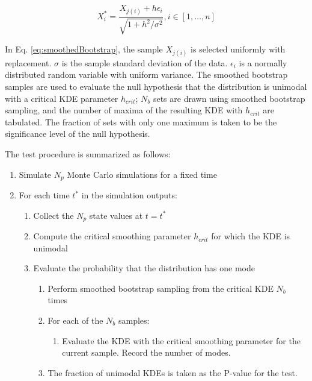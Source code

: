 \documentclass[]{article}
\begin{document}
\begin{equation}
X_i^* = \frac{X_{j(i)} + h\epsilon_i}{\sqrt{1+h^2/\sigma^2}}, i \in [1,\dots,n]
\label{eq:smoothedBootstrap}
\end{equation}

In Eq. \ref{eq:smoothedBootstrap}, the sample $X_{j(i)}$ is selected uniformly with replacement. $\sigma$ is the sample standard deviation of the data. $\epsilon_i$ is a normally distributed random variable with uniform variance. The smoothed bootstrap samples are used to evaluate the null hypothesis that the distribution is unimodal with a critical KDE parameter $h_{crit}$; $N_b$ sets are drawn using smoothed bootstrap sampling, and the number of maxima of the resulting KDE with $h_{crit}$ are tabulated. The fraction of sets with only one maximum is taken to be the significance level of the null hypothesis.

The test procedure is summarized as follows:

\begin{enumerate}
\item Simulate $N_p$ Monte Carlo simulations for a fixed time
\item For each time $t^*$ in the simulation outputs:
\begin{enumerate}
	\item Collect the $N_p$ state values at $t = t^*$
	\item Compute the critical smoothing parameter $h_{crit}$ for which the KDE is unimodal
	\item Evaluate the probability that the distribution has one mode
	\begin{enumerate}
		\item Perform smoothed bootstrap sampling from the critical KDE $N_b$ times
		\item For each of the $N_b$ samples:
		\begin{enumerate}
			\item Evaluate the KDE with the critical smoothing parameter for the current sample. Record the number of modes.
		\end{enumerate}
		\item The fraction of unimodal KDEs is taken as the P-value for the test.	
	\end{enumerate}
\end{enumerate}
\end{enumerate}



\end{document}
